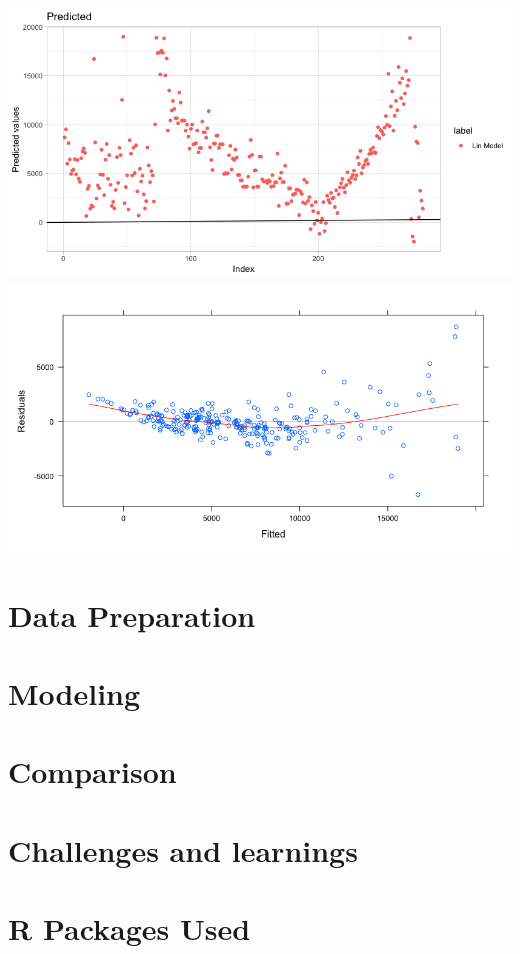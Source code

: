 \documentclass[floatsintext,man]{apa6}
\theoremstyle{definition}
\theoremstyle{definition}
\theoremstyle{definition}
\theoremstyle{remark}
\begin{document}
\includegraphics{../reports/lm_unsorted_yhats.png}
\includegraphics{../reports/lm_unsorted_residuals.png}

\section{Data Preparation}\label{data-preparation}

\section{Modeling}\label{modeling}

\section{Comparison}\label{comparison}

\section{Challenges and learnings}\label{challenges-and-learnings}

\newpage

\section{R Packages Used}\label{r-packages-used}

\newpage

\begingroup
\setlength{\parindent}{-0.5in} \setlength{\leftskip}{0.5in}

\hypertarget{refs}{}

\endgroup
\end{document}
